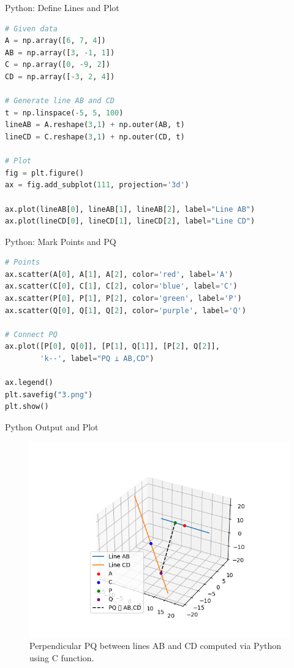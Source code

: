 \documentclass{beamer}
\begin{document}
\begin{frame}[fragile]{Python: Define Lines and Plot}
\begin{lstlisting}[language=Python]
# Given data
A = np.array([6, 7, 4])
AB = np.array([3, -1, 1])
C = np.array([0, -9, 2])
CD = np.array([-3, 2, 4])

# Generate line AB and CD
t = np.linspace(-5, 5, 100)
lineAB = A.reshape(3,1) + np.outer(AB, t)
lineCD = C.reshape(3,1) + np.outer(CD, t)

# Plot
fig = plt.figure()
ax = fig.add_subplot(111, projection='3d')

ax.plot(lineAB[0], lineAB[1], lineAB[2], label="Line AB")
ax.plot(lineCD[0], lineCD[1], lineCD[2], label="Line CD")
\end{lstlisting}
\end{frame}

\begin{frame}[fragile]{Python: Mark Points and PQ}
\begin{lstlisting}[language=Python]
# Points
ax.scatter(A[0], A[1], A[2], color='red', label='A')
ax.scatter(C[0], C[1], C[2], color='blue', label='C')
ax.scatter(P[0], P[1], P[2], color='green', label='P')
ax.scatter(Q[0], Q[1], Q[2], color='purple', label='Q')

# Connect PQ
ax.plot([P[0], Q[0]], [P[1], Q[1]], [P[2], Q[2]],
        'k--', label="PQ ⟂ AB,CD")

ax.legend()
plt.savefig("3.png")
plt.show()
\end{lstlisting}
\end{frame}


\begin{frame}{Python Output and Plot}
\begin{figure}[h!]
\centering
\includegraphics[width=0.75\columnwidth]{figs/3.png}
\caption{Perpendicular PQ between lines AB and CD computed via Python using C function.}
\end{figure}
\end{frame}
\end{document}
